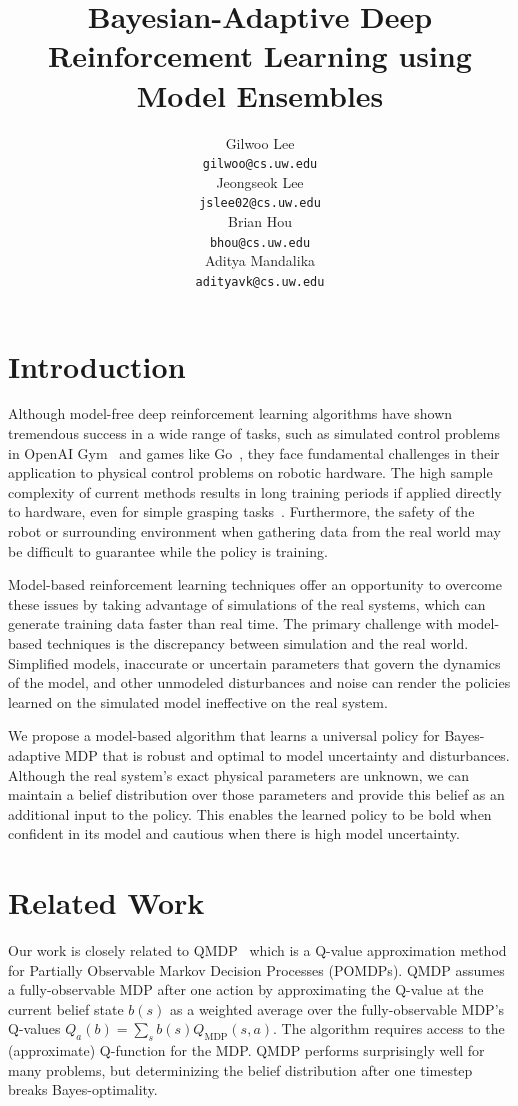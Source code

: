 \documentclass{article}
\title{Bayesian-Adaptive Deep Reinforcement Learning using Model Ensembles}
\author{
  Gilwoo Lee \\ \texttt{gilwoo@cs.uw.edu} \\
  \And
  Jeongseok Lee \\ \texttt{jslee02@cs.uw.edu} \\
  \And
  Brian Hou \\ \texttt{bhou@cs.uw.edu} \\
  \And
  Aditya Mandalika \\ \texttt{adityavk@cs.uw.edu} \\
}
\begin{document}
\maketitle


\section{Introduction}
Although model-free deep reinforcement learning algorithms have shown tremendous success in a wide range of tasks, such as simulated control problems in OpenAI Gym~\cite{openai-gym} and games like Go~\cite{alphago}, they face fundamental challenges in their application to physical control problems on robotic hardware.
The high sample complexity of current methods results in long training periods if applied directly to hardware, even for simple grasping tasks~\cite{levine2016armfarm}.
Furthermore, the safety of the robot or surrounding environment when gathering data from the real world may be difficult to guarantee while the policy is training.

Model-based reinforcement learning techniques offer an opportunity to overcome these issues by taking advantage of simulations of the real systems, which can generate training data faster than real time.
The primary challenge with model-based techniques is the discrepancy between simulation and the real world.
Simplified models, inaccurate or uncertain parameters that govern the dynamics of the model, and other unmodeled disturbances and noise can render the policies learned on the simulated model ineffective on the real system.

We propose a model-based algorithm that learns a universal policy for Bayes-adaptive MDP that is robust and optimal to model uncertainty and disturbances. Although the real system's exact physical parameters are unknown, we can maintain a belief distribution over those parameters and provide this belief as an additional input to the policy.
This enables the learned policy to be bold when confident in its model and cautious when there is high model uncertainty.

\section{Related Work}
Our work is closely related to QMDP~\cite{littman1995learning, karkus2017qmdp} which is a Q-value approximation method for Partially Observable Markov Decision Processes (POMDPs).
QMDP assumes a fully-observable MDP after one action by approximating the Q-value at the current belief state $b(s)$ as a weighted average over the fully-observable MDP's Q-values $Q_a(b) = \sum_s b(s)Q_{\text{MDP}}(s, a)$.
The algorithm requires access to the (approximate) Q-function for the MDP.
QMDP performs surprisingly well for many problems, but determinizing the belief distribution after one timestep breaks Bayes-optimality.
\end{document}
